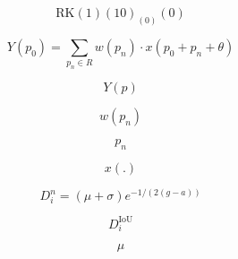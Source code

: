 \documentclass[journal]{IEEEtran}
\begin{document}
\begin{equation}
\mathrm{RK}(1)(10)_(0)(0)
\label{eq:eq_50}
\end{equation}

\begin{equation}
Y(p_0) = \sum_{p_n \in R} w(p_n) \cdot x(p_0 + p_n + \theta)
\label{eq:eq_51}
\end{equation}

\begin{equation}
Y(p)
\label{eq:eq_52}
\end{equation}

\begin{equation}
w(p_n)
\label{eq:eq_53}
\end{equation}

\begin{equation}
p_n
\label{eq:eq_54}
\end{equation}

\begin{equation}
x(.)
\label{eq:eq_55}
\end{equation}

\begin{equation}
D_i^n = (\mu + \sigma) e^{-1/(2(g - a))}
\label{eq:eq_56}
\end{equation}

\begin{equation}
D_i^{\text{IoU}}
\label{eq:eq_57}
\end{equation}

\begin{equation}
\mu
\label{eq:eq_58}
\end{equation}
\end{document}
